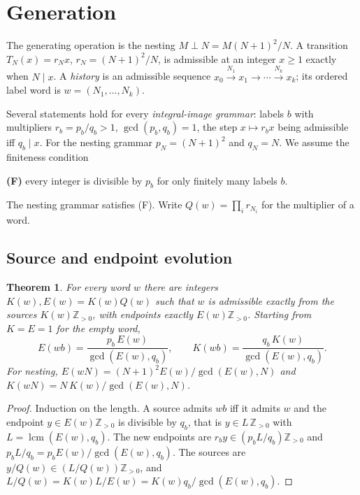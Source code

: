 \documentclass[11pt,a4paper]{article}
\newtheorem{theorem}{Theorem}[section]
\begin{document}
\section{Generation}

The generating operation is the nesting \(M\perp N=M(N+1)^2/N\). A
transition \(T_N(x)=r_Nx\), \(r_N=(N+1)^2/N\), is admissible at an
integer \(x\ge1\) exactly when \(N\mid x\). A \emph{history} is an
admissible sequence
\(x_0\xrightarrow{N_1}x_1\to\cdots\xrightarrow{N_k}x_k\); its ordered
label word is \(w=(N_1,\dots,N_k)\).

Several statements hold for every \emph{integral-image grammar}: labels
\(b\) with multipliers \(r_b=p_b/q_b>1\), \(\gcd(p_b,q_b)=1\), the step
\(x\mapsto r_bx\) being admissible iff \(q_b\mid x\). For the nesting
grammar \(p_N=(N+1)^2\) and \(q_N=N\). We assume the finiteness
condition

\textbf{(F)} every integer is divisible by \(p_b\) for only finitely
many labels \(b\).

The nesting grammar satisfies (F). Write \(Q(w)=\prod_i r_{N_i}\) for
the multiplier of a word.

\subsection{Source and endpoint
evolution}

\begin{theorem}\label{thm:evolution}
For every word \(w\) there are integers \(K(w),E(w)=K(w)Q(w)\) such that
\(w\) is admissible exactly from the sources \(K(w)\mathbb Z_{>0}\),
with endpoints exactly \(E(w)\mathbb Z_{>0}\). Starting from \(K=E=1\)
for the empty word,
\[E(wb)=\frac{p_b\,E(w)}{\gcd(E(w),q_b)},\qquad K(wb)=\frac{q_b\,K(w)}{\gcd(E(w),q_b)} .\]
For nesting, \(E(wN)=(N+1)^2E(w)/\gcd(E(w),N)\) and
\(K(wN)=N\,K(w)/\gcd(E(w),N)\).

\end{theorem}

\begin{proof}

Induction on the length. A source admits \(wb\) iff it admits \(w\) and
the endpoint \(y\in E(w)\mathbb Z_{>0}\) is divisible by \(q_b\), that
is \(y\in L\,\mathbb Z_{>0}\) with \(L=\operatorname{lcm}(E(w),q_b)\).
The new endpoints are \(r_by\in (p_bL/q_b)\mathbb Z_{>0}\) and
\(p_bL/q_b=p_bE(w)/\gcd(E(w),q_b)\). The sources are
\(y/Q(w)\in(L/Q(w))\mathbb Z_{>0}\), and
\(L/Q(w)=K(w)L/E(w)=K(w)q_b/\gcd(E(w),q_b)\).

\end{proof}
\end{document}
